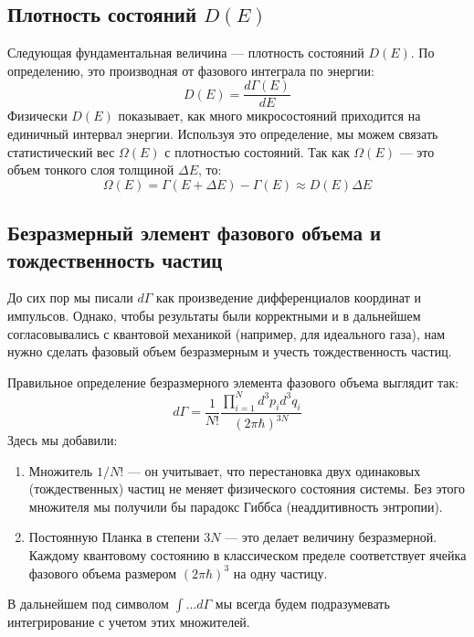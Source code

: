 \documentclass[../general/general]{subfiles}
\begin{document}
\subsection{Плотность состояний $D(E)$}

Следующая фундаментальная величина — плотность состояний $D(E)$. По определению, это производная от фазового интеграла по энергии:
\begin{equation}
    D(E) = \frac{d\Gamma(E)}{dE}
\end{equation}
Физически $D(E)$ показывает, как много микросостояний приходится на единичный интервал энергии. Используя это определение, мы можем связать статистический вес $\Omega(E)$ с плотностью состояний. Так как $\Omega(E)$ — это объем тонкого слоя толщиной $\Delta E$, то:
\begin{equation}
    \Omega(E) = \Gamma(E + \Delta E) - \Gamma(E) \approx D(E) \Delta E
\end{equation}

\subsection{Безразмерный элемент фазового объема и тождественность частиц}

До сих пор мы писали $d\Gamma$ как произведение дифференциалов координат и импульсов. Однако, чтобы результаты были корректными и в дальнейшем согласовывались с квантовой механикой (например, для идеального газа), нам нужно сделать фазовый объем безразмерным и учесть тождественность частиц.

Правильное определение безразмерного элемента фазового объема выглядит так:
\begin{equation}
    d\Gamma = \frac{1}{N!} \frac{\prod_{i=1}^N d^3 p_i d^3 q_i}{(2\pi\hbar)^{3N}}
\end{equation}
Здесь мы добавили:
\begin{enumerate}
    \item Множитель $1/N!$ — он учитывает, что перестановка двух одинаковых (тождественных) частиц не меняет физического состояния системы. Без этого множителя мы получили бы парадокс Гиббса (неаддитивность энтропии).
    \item Постоянную Планка в степени $3N$ — это делает величину безразмерной. Каждому квантовому состоянию в классическом пределе соответствует ячейка фазового объема размером $(2\pi\hbar)^3$ на одну частицу.
\end{enumerate}

В дальнейшем под символом $\int \dots d\Gamma$ мы всегда будем подразумевать интегрирование с учетом этих множителей.
\end{document}

